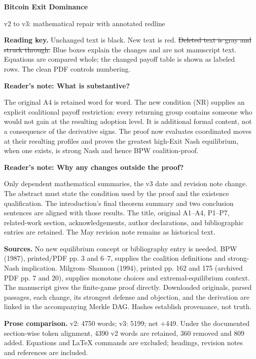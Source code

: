 \documentclass[12pt]{article}
\theoremstyle{definition}
\theoremstyle{remark}
\providecommand{\DIFaddtex}[1]{{\color{AddedText}#1}}
\providecommand{\DIFdeltex}[1]{{\color{DeletedText}\sout{#1}}}
\newcommand{\ReviewNote}[2]{\par\begin{mdframed}[backgroundcolor=blue!3,linecolor=NoteText,linewidth=0.6pt]\color{NoteText}\small\textbf{Reader's note: #1}\par #2\end{mdframed}\par}
\providecommand{\DIFadd}[1]{\texorpdfstring{\DIFaddtex{#1}}{#1}} %
\providecommand{\DIFdel}[1]{\texorpdfstring{\DIFdeltex{#1}}{}} %
\begin{document}
\begin{center}
{\LARGE\bfseries Bitcoin Exit Dominance}\par\medskip
{\large v2 to v3: mathematical repair with annotated redline}\par
\end{center}
\noindent\textbf{Reading key.} Unchanged text is black. \DIFadd{New text is red.} \DIFdel{Deleted text is gray and struck through.} Blue boxes explain the changes and are not manuscript text. Equations are compared whole; the changed payoff table is shown as labeled rows. The clean PDF controls numbering.

\ReviewNote{What is substantive?}{The original A4 is retained word for word. The new condition (NR) supplies an explicit coalitional payoff restriction: every returning group contains someone who would not gain at the resulting adoption level. It is additional formal content, not a consequence of the derivative signs. The proof now evaluates coordinated moves at their resulting profiles and proves the greatest high-Exit Nash equilibrium, when one exists, is strong Nash and hence BPW coalition-proof.}

\ReviewNote{Why any changes outside the proof?}{Only dependent mathematical summaries, the v3 date and revision note change. The abstract must state the condition used by the proof and the existence qualification. The introduction's final theorem summary and two conclusion sentences are aligned with those results. The title, original A1--A4, P1--P7, related-work section, acknowledgements, author declarations, and bibliographic entries are retained. The May revision note remains as historical text.}

\noindent\textbf{Sources.} No new equilibrium concept or bibliography entry is needed. BPW (1987), printed/PDF pp. 3 and 6--7, supplies the coalition definitions and strong-Nash implication. Milgrom--Shannon (1994), printed pp. 162 and 175 (archived PDF pp. 7 and 20), supplies monotone choices and extremal-equilibrium context. The manuscript gives the finite-game proof directly. Downloaded originals, parsed passages, each change, its strongest defense and objection, and the derivation are linked in the accompanying Merkle DAG. Hashes establish provenance, not truth.

\par\medskip\noindent\textbf{Prose comparison.} v2: 4750 words; v3: 5199; net +449. Under the documented section-wise token alignment, 4390 v2 words are retained, 360 removed and 809 added. Equations and LaTeX commands are excluded; headings, revision notes and references are included.
\clearpage
\end{document}
